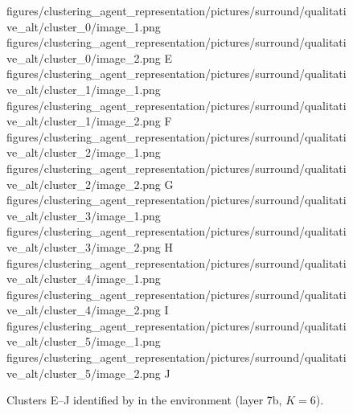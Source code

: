 \begin{figure}[H]
    \qualitativeClusterFigureSetup
    \qualitativeClusterTwo
        {figures/clustering_agent_representation/pictures/surround/qualitative_alt/cluster_0/image_1.png}
        {figures/clustering_agent_representation/pictures/surround/qualitative_alt/cluster_0/image_2.png}
        {E}
    \qualitativeClusterTwo
        {figures/clustering_agent_representation/pictures/surround/qualitative_alt/cluster_1/image_1.png}
        {figures/clustering_agent_representation/pictures/surround/qualitative_alt/cluster_1/image_2.png}
        {F}
    \qualitativeClusterTwo
        {figures/clustering_agent_representation/pictures/surround/qualitative_alt/cluster_2/image_1.png}
        {figures/clustering_agent_representation/pictures/surround/qualitative_alt/cluster_2/image_2.png}
        {G}
    \qualitativeClusterTwo
        {figures/clustering_agent_representation/pictures/surround/qualitative_alt/cluster_3/image_1.png}
        {figures/clustering_agent_representation/pictures/surround/qualitative_alt/cluster_3/image_2.png}
        {H}
    \qualitativeClusterTwo
        {figures/clustering_agent_representation/pictures/surround/qualitative_alt/cluster_4/image_1.png}
        {figures/clustering_agent_representation/pictures/surround/qualitative_alt/cluster_4/image_2.png}
        {I}
    \qualitativeClusterTwo
        {figures/clustering_agent_representation/pictures/surround/qualitative_alt/cluster_5/image_1.png}
        {figures/clustering_agent_representation/pictures/surround/qualitative_alt/cluster_5/image_2.png}
        {J}
    \caption{Clusters E--J identified by  in the \SurroundName environment (layer 7b, $K=6$).}
    \label{fig:qualitative_surround_alt}
\end{figure}
